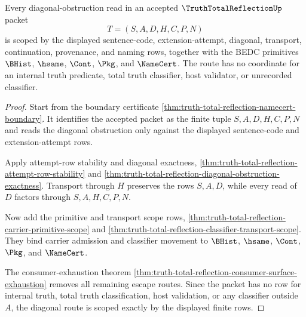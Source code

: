 \begin{theorem}
\label{thm:truth-total-reflection-diagonal-route-scope}
Every diagonal-obstruction read in an accepted $\TruthTotalReflectionUp$ packet
$$
T=(S,A,D,H,C,P,N)
$$
is scoped by the displayed sentence-code, extension-attempt, diagonal, transport, continuation, provenance, and naming rows, together with the BEDC primitives $\BHist$, $\hsame$, $\Cont$, $\Pkg$, and $\NameCert$. The route has no coordinate for an internal truth predicate, total truth classifier, host validator, or unrecorded classifier.
\end{theorem}
\begin{proof}
Start from the boundary certificate \autoref{thm:truth-total-reflection-namecert-boundary}. It identifies the accepted packet as the finite tuple $S,A,D,H,C,P,N$ and reads the diagonal obstruction only against the displayed sentence-code and extension-attempt rows.

Apply attempt-row stability and diagonal exactness, \autoref{thm:truth-total-reflection-attempt-row-stability} and \autoref{thm:truth-total-reflection-diagonal-obstruction-exactness}. Transport through $H$ preserves the rows $S,A,D$, while every read of $D$ factors through $S,A,H,C,P,N$.

Now add the primitive and transport scope rows, \autoref{thm:truth-total-reflection-carrier-primitive-scope} and \autoref{thm:truth-total-reflection-classifier-transport-scope}. They bind carrier admission and classifier movement to $\BHist$, $\hsame$, $\Cont$, $\Pkg$, and $\NameCert$.

The consumer-exhaustion theorem \autoref{thm:truth-total-reflection-consumer-surface-exhaustion} removes all remaining escape routes. Since the packet has no row for internal truth, total truth classification, host validation, or any classifier outside $A$, the diagonal route is scoped exactly by the displayed finite rows.
\end{proof}

